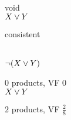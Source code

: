 \begin{frame}{\myframetitle}
\begin{fancycolumns}[t]
\begin{exampletight}{}
\begin{fancycolumns}[animation=none]
				void
			\nextcolumn
				\centering
				{\small{}\\$X \vee Y$}

				consistent
			\end{fancycolumns}
		\end{exampletight}
		\nextcolumn
		\begin{exampletight}{}
			\begin{fancycolumns}[animation=none]
				\centering
				{\small{}\\$\neg (X \vee Y)$}

				$0$ products, VF $0$
			\nextcolumn
				\centering
				{\small{}\\$X \vee Y$}

				$2$ products, VF $\frac{2}{8}$
			\end{fancycolumns}
		\end{exampletight}
	\end{fancycolumns}
\end{frame}

